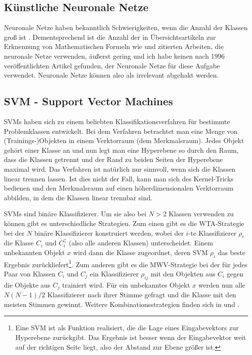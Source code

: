 \subsection{Künstliche Neuronale Netze} \label{sub:kuenstliche_neuronale_netze}

Neuronale Netze haben bekanntlich Schwierigkeiten, wenn die Anzahl der Klassen groß ist \cite{Jaeger:2003p1097}. Dementsprechend ist die Anzahl der in Übersichtsartikeln zur Erknennung von Mathematischen Formeln wie \cite{Chan:2000p559} und \cite{Tapia:2007p9160} zitierten Arbeiten, die neuronale Netze verwenden, äußerst gering und ich habe keinen nach 1996 veröffentlichten Artikel gefunden, der Neuronale Netze für diese Aufgabe verwendet. Neuronale Netze können also als irrelevant abgehakt werden.

\subsection[SVM]{SVM - Support Vector Machines} \label{sub:svm}

\ac{SVM}s haben sich zu einem beliebten Klassifikationsverfahren für bestimmte Problemklassen entwickelt. Bei dem Verfahren betrachtet man eine Menge von (Trainings-)Objekten in einem Verktorraum (dem Merkmalsraum). Jedes Objekt gehört einer Klasse an und nun legt man eine Hyperebene so durch den Raum, dass die Klassen getrennt und der Rand zu beiden Seiten der Hyperebene maximal wird. Das Verfahren ist natürlich nur sinnvoll, wenn sich die Klassen linear trennen lassen. Ist dies nicht der Fall, kann man sich des Kernel-Tricks bedienen und den Merkmalsraum auf einen höherdimensionalen Verktorraum abbilden, in dem die Klassen linear trennbar sind.

\ac{SVM}s sind binäre Klassifizierer. Um sie also bei $N>2$ Klassen verwenden zu können gibt es unterschiedliche Strategien. Zum einen gibt es die \ac{WTA}-Strategie bei der $N$ binäre Klassifizierer konstruiert werden, wobei der $i$-te Klassifizierer $\rho_i$ die Klasse $C_i$ und $C_i^{\complement}$ (also alle anderen Klassen) unterscheidet. Einem unbekannten Objekt $x$ wird dann die Klasse zugeordnet, deren SVM $\rho_i$ das beste Ergebnis zurückliefert\footnote{Eine SVM ist als Funktion realisiert, die die Lage eines Eingabevektors zur Hyperebene zurückgibt. Das Ergebnis ist besser wenn der Eingabevektor weit auf der richtigen Seite liegt, also der Abstand zur Ebene größer ist.}. Zum anderen gibt es die \ac{MWV}-Strategie bei der für jedes Paar von Klassen $C_i$ und $C_j$ ein Klassifizierer $\rho_{ij}$ mit den Objekten aus $C_i$ gegen die Objekte aus $C_j$ trainiert wird. Für ein unbekanntes Objekt $x$ werden nun alle $N(N-1)/2$ Klassifizierer nach ihrer Stimme gefragt und die Klasse mit den meisten Stimmen gewinnt. Weitere Kombinationsstrategien finden sich in \cite{Duan:2005p11426} und \cite{Platt:2000p11488}.

